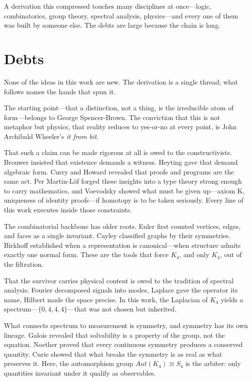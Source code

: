 \documentclass[11pt,a4paper]{book}
\def\mathrm#1{#1}%
\begin{document}
A derivation this compressed touches many disciplines at once—logic, combinatorics, group theory, spectral analysis, physics—and every one of them was built by someone else. The debts are large because the chain is long.

\section*{Debts}

None of the ideas in this work are new. The derivation is a single thread; what follows names the hands that spun it.

The starting point—that a distinction, not a thing, is the irreducible atom of form—belongs to George Spencer-Brown. The conviction that this is not metaphor but physics, that reality reduces to yes-or-no at every point, is John Archibald Wheeler's \textit{it from bit}.

That such a claim can be made rigorous at all is owed to the constructivists. Brouwer insisted that existence demands a witness. Heyting gave that demand algebraic form. Curry and Howard revealed that proofs and programs are the same act. Per Martin-Löf forged these insights into a type theory strong enough to carry mathematics, and Voevodsky showed what must be given up—axiom K, uniqueness of identity proofs—if homotopy is to be taken seriously. Every line of this work executes inside those constraints.

The combinatorial backbone has older roots. Euler first counted vertices, edges, and faces as a single invariant. Cayley classified graphs by their symmetries. Birkhoff established when a representation is canonical—when structure admits exactly one normal form. These are the tools that force $K_4$, and only $K_4$, out of the filtration.

That the survivor carries physical content is owed to the tradition of spectral analysis: Fourier decomposed signals into modes, Laplace gave the operator its name, Hilbert made the space precise. In this work, the Laplacian of $K_4$ yields a spectrum—$\{0,4,4,4\}$—that was not chosen but inherited.

What connects spectrum to measurement is symmetry, and symmetry has its own lineage. Galois revealed that solvability is a property of the group, not the equation. Noether proved that every continuous symmetry produces a conserved quantity. Curie showed that what breaks the symmetry is as real as what preserves it. Here, the automorphism group $\mathrm{Aut}(K_4) \cong S_4$ is the arbiter: only quantities invariant under it qualify as observables.
\end{document}
